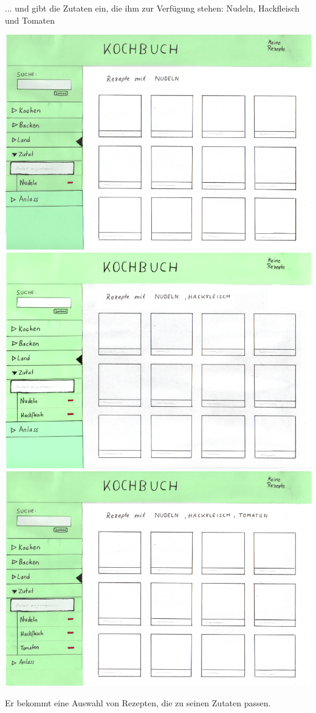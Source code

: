 \documentclass[parskip,10pt,abstracton]{scrartcl}
\begin{document}
... und gibt die Zutaten ein, die ihm zur Verfügung stehen: Nudeln, Hackfleisch und Tomaten
\begin{center}
\includegraphics[scale=0.4]{Prototyp/menu_zutat_nudeln.png}\\[1em]
\includegraphics[scale=0.4]{Prototyp/menu_zutat_nudelnhackfleisch.png}\\[1em]
\includegraphics[scale=0.4]{Prototyp/menu_zutat_nudelnhackfleischtomate.png}
\end{center}
Er bekommt eine Auswahl von Rezepten, die zu seinen Zutaten passen.
\end{document}
